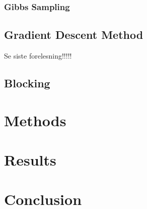 \documentclass[12pt,a4paper,english]{article}
\begin{document}
\subsubsection{Gibbs Sampling}
\label{subsubsect:Gibbs}
\subsection{Gradient Descent Method}
\label{subsect:Gradient}
Se siste forelesning!!!!!
\subsection{Blocking}
\label{subsect:Blocking}
\section{Methods}
\label{sect:Methods}
\section{Results}
\label{sect:Results}
\section{Conclusion}
\label{sect:Conclusion}



\end{document}
